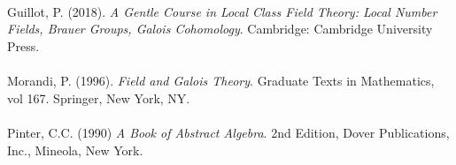 \documentclass{article}
\begin{document}
 \\\\\\
Guillot, P. (2018). \emph{A Gentle Course in Local Class Field Theory: Local Number Fields, Brauer Groups, Galois Cohomology}. Cambridge: Cambridge University Press. \\\\
Morandi, P. (1996). \emph{Field and Galois Theory}. Graduate Texts in Mathematics, vol 167. Springer, New York, NY. \\\\
Pinter, C.C. (1990) \emph{A Book of Abstract Algebra}. 2nd Edition, Dover Publications, Inc., Mineola, New York. \\\\
\end{document}
